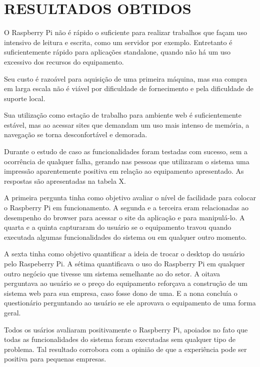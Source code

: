 \chapter{RESULTADOS OBTIDOS}

O Raspberry Pi não é rápido o suficiente para realizar trabalhos que façam uso intensivo de leitura e escrita, como um servidor por exemplo. Entretanto é suficientemente rápido para aplicações standalone, quando não há um uso excessivo dos recursos do equipamento.

Seu custo é razoável para aquisição de uma primeira máquina, mas sua compra em larga escala não é viável por dificuldade de fornecimento e pela dificuldade de suporte local.

Sua utilização como estação de trabalho para ambiente web é suficientemente estável, mas ao acessar sites que demandam um uso mais intenso de memória, a navegação se torna desconfortável e demorada.

Durante o estudo de caso as funcionalidades foram testadas com sucesso, sem a ocorrência de qualquer falha, gerando nas pessoas que utilizaram o sistema uma impressão aparentemente positiva em relação ao equipamento apresentado. As respostas são apresentadas na tabela X.

A primeira pergunta tinha como objetivo avaliar o nível de facilidade para colocar o Raspberry Pi em funcionamento. A segunda e a terceira eram relacionadas ao desempenho do browser para acessar o site da aplicação e para manipulá-lo. A quarta e a quinta capturaram do usuário se o equipamento travou quando executada algumas funcionalidades do sistema ou em qualquer outro momento.

A sexta tinha como objetivo quantificar a ideia de trocar o desktop do usuário pelo Raspeberry Pi. A sétima quantificava o uso do Raspberry Pi em qualquer outro negócio que tivesse um sistema semelhante ao do setor. A oitava perguntava ao usuário se o preço do equipamento reforçava a construção de um sistema web para sua empresa, caso fosse dono de uma. E a nona concluía o questionário perguntando ao usuário se ele aprovava o equipamento de uma forma geral.

Todos os usários avaliaram positivamente o Raspberry Pi, apoiados no fato que todas as funcionalidades do sistema foram executadas sem qualquer tipo de problema. Tal resultado corrobora com a opinião de que a experiência pode ser positiva para pequenas empresas.
